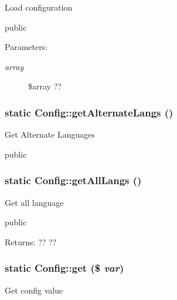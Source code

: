 Load configuration

public \begin{Desc}
\item[Parameters:]
\begin{description}
\item[{\em array}]\$array ?? \end{description}
\end{Desc}
\hypertarget{classConfig_a149b732a598127118181e5b5404f0b4}{
\subsubsection[getAlternateLangs]{\setlength{\rightskip}{0pt plus 5cm}static Config::getAlternateLangs ()}}
\label{classConfig_a149b732a598127118181e5b5404f0b4}


Get Alternate Languages

public \hypertarget{classConfig_5ee304b559ffded8d924349debf8708b}{
\subsubsection[getAllLangs]{\setlength{\rightskip}{0pt plus 5cm}static Config::getAllLangs ()}}
\label{classConfig_5ee304b559ffded8d924349debf8708b}


Get all language

public \begin{Desc}
\item[Returns:]?? ?? \end{Desc}
\hypertarget{classConfig_c611a0172a86bc5f4305bee2a041dd85}{
\subsubsection[get]{\setlength{\rightskip}{0pt plus 5cm}static Config::get (\$ {\em var})}}
\label{classConfig_c611a0172a86bc5f4305bee2a041dd85}


Get config value

